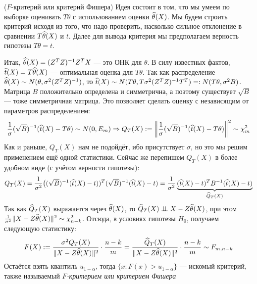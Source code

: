 \begin{solution} ($F$-критерий или критерий Фишера)
	Идея состоит в том, что мы умеем по выборке оценивать $T\theta$ с использованием оценки $\widehat{\theta}(X)$. Мы будем строить критерий исходя из того, что надо проверить, насколько сильное отклонение в сравнении $T\widehat{\theta}(X)$ и $t$. Далее для вывода критерия мы предполагаем верность гипотезы $T\theta = t$.
	
	Итак, $\widehat{\theta}(X) = (Z^TZ)^{-1}Z^TX$ --- это ОНК для $\theta$. В силу известных фактов, $\widehat{t}(X) = T\widehat{\theta}(X)$ --- оптимальная оценка для $T\theta$. Так как распределение $\widehat{\theta}(X) \sim N(\theta, \sigma^2(Z^TZ)^{-1})$, то $\widehat{t}(X) \sim N(T\theta, T\sigma^2(Z^TZ)^{-1}T^T) =: N(T\theta, \sigma^2B)$. Матрица $B$ положительно определена и симметрична, а поэтому существует $\sqrt{B}$ --- тоже симметричная матрица. Это позволяет сделать оценку с независящим от параметров распределением:
	\[
		\frac{1}{\sigma}(\sqrt{B})^{-1}(\widehat{t}(X) - T\theta) \sim N(0, E_m) \Rightarrow Q_T(X) := \left\|\frac{1}{\sigma}(\sqrt{B})^{-1}(\widehat{t}(X) - T\theta)\right\|^2 \sim \chi_m^2
	\]
	Как и раньше, $Q_T(X)$ нам не подойдёт, ибо присутствует $\sigma$, но это мы решим применением ещё одной статистики. Сейчас же перепишем $Q_T(X)$ в более удобном виде (с учётом верности гипотезы):
	\[
		Q_T(X) = \frac{1}{\sigma^2} \big((\sqrt{B})^{-1}(\widehat{t}(X) - t))^T(\sqrt{B})^{-1}(\widehat{t}(X) - t) = \frac{1}{\sigma^2}\underbrace{(\widehat{t}(X) - t)^TB^{-1}(\widehat{t}(X) - t)}_{\widehat{Q}_T(X)}
	\]
	Так как $\widehat{Q}_T(X)$ выражается через $\widehat{\theta}(X)$, то $\widehat{Q}_T(X) \perp\mkern-9.5mu\perp X - Z\widehat{\theta}(X)$, при этом $\frac{1}{\sigma^2}\|X - Z\widehat{\theta}(X)\|^2 \sim \chi_{n - k}^2$. Отсюда, в условиях гипотезы $H_0$, получаем следующую статистику:
	\[
		F(X) := \frac{\sigma^2 Q_T(X)}{\|X - Z\widehat{\theta}(X)\|^2} \cdot \frac{n - k}{m} = \frac{\widehat{Q}_T(X)}{\|X - Z\widehat{\theta}(X)\|^2} \cdot \frac{n - k}{m} \sim F_{m, n - k}
	\]
	Остаётся взять квантиль $u_{1 - \alpha}$, тогда $\{x \colon F(x) > u_{1 - \alpha}\}$ --- искомый критерий, также называемый \textit{$F$-критерием или критерием Фишера}
\end{solution}

